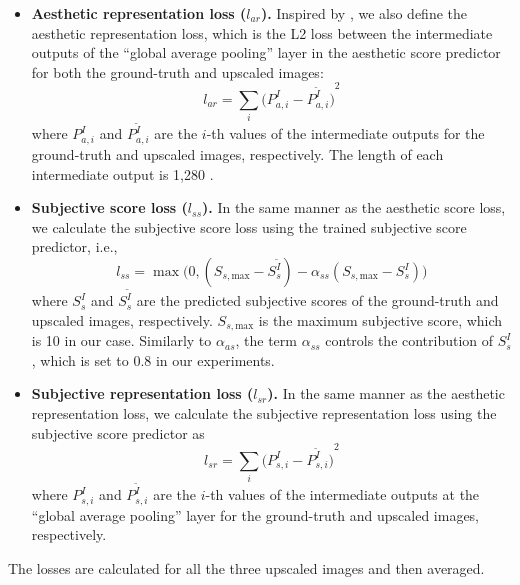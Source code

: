 \documentclass[runningheads]{llncs}
\begin{document}
\begin{itemize}
	\item \textbf{Aesthetic representation loss (${l}_{ar}$).}
	Inspired by \cite{ledig2017photo}, we also define the aesthetic representation loss, which is the L2 loss between the intermediate outputs of the ``global average pooling'' layer in the aesthetic score predictor for both the ground-truth and upscaled images:
	\begin{equation}{l}_{ar} = \sum_{i} {\big({P}_{a, i}^{I} - {P}_{a, i}^{\widetilde{I}}\big)}^{2}
	\end{equation}
	where ${P}_{a, i}^{I}$ and ${P}_{a, i}^{\widetilde{I}}$ are the $i$-th values of the intermediate outputs for the ground-truth and upscaled images, respectively.
	The length of each intermediate output is 1,280 \cite{sandler2018mobilenetv2}.
	
	\item \textbf{Subjective score loss (${l}_{ss}$).}
	In the same manner as the aesthetic score loss, we calculate the subjective score loss using the trained subjective score predictor, i.e.,
	\begin{equation}{l}_{ss} = \max \big( 0, ({S}_{s,\textrm{max}} - {S}_{s}^{\widetilde{I}}) - \alpha_{ss} ({S}_{s,\textrm{max}} - {S}_{s}^{I}) \big)
	\end{equation}
	where ${S}_{s}^{I}$ and ${S}_{s}^{\widetilde{I}}$ are the predicted subjective scores of the ground-truth and upscaled images, respectively.
	${S}_{s,\textrm{max}}$ is the maximum subjective score, which is 10 in our case.
	Similarly to $\alpha_{as}$, the term $\alpha_{ss}$ controls the contribution of ${S}_{s}^{I}$, which is set to 0.8 in our experiments.
	
	\item \textbf{Subjective representation loss (${l}_{sr}$).}
	In the same manner as the aesthetic representation loss, we calculate the subjective representation loss using the subjective score predictor as
	\begin{equation}{l}_{sr} = \sum_{i} {\big({P}_{s, i}^{I} - {P}_{s, i}^{\widetilde{I}}\big)}^{2}
	\end{equation}
	where ${P}_{s, i}^{I}$ and ${P}_{s, i}^{\widetilde{I}}$ are the $i$-th values of the intermediate outputs at the ``global average pooling'' layer for the ground-truth and upscaled images, respectively.
	
\end{itemize}
The losses are calculated for all the three upscaled images and then averaged.
\end{document}
